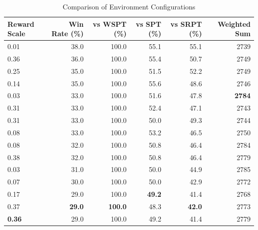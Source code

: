 \begin{table}[htbp]%
\centering%
\begin{tabular}{lrrrrr}%
\toprule%
\textbf{Reward Scale}&\textbf{Win Rate (\%)}&\textbf{vs WSPT (\%)}&\textbf{vs SPT (\%)}&\textbf{vs SRPT (\%)}&\textbf{Weighted Sum}\\%
\midrule%
0.01&38.0&100.0&55.1&55.1&2739\\%
0.36&36.0&100.0&55.4&50.7&2749\\%
0.25&35.0&100.0&51.5&52.2&2749\\%
0.14&35.0&100.0&55.6&48.6&2746\\%
0.03&33.0&100.0&51.6&47.8&\textbf{2784}\\%
0.31&33.0&100.0&52.4&47.1&2743\\%
0.31&33.0&100.0&50.0&49.3&2744\\%
0.08&33.0&100.0&53.2&46.5&2750\\%
0.08&32.0&100.0&50.8&46.4&2784\\%
0.38&32.0&100.0&50.8&46.4&2779\\%
0.03&31.0&100.0&50.0&44.9&2785\\%
0.07&30.0&100.0&50.0&42.9&2772\\%
0.17&29.0&100.0&\textbf{49.2}&41.4&2768\\%
0.37&\textbf{29.0}&\textbf{100.0}&48.3&\textbf{42.0}&2773\\%
\textbf{0.36}&29.0&100.0&49.2&41.4&2779\\%
\bottomrule%
\end{tabular}%
\caption{Comparison of Environment Configurations}%
\label{tab:environment}%
\end{table}